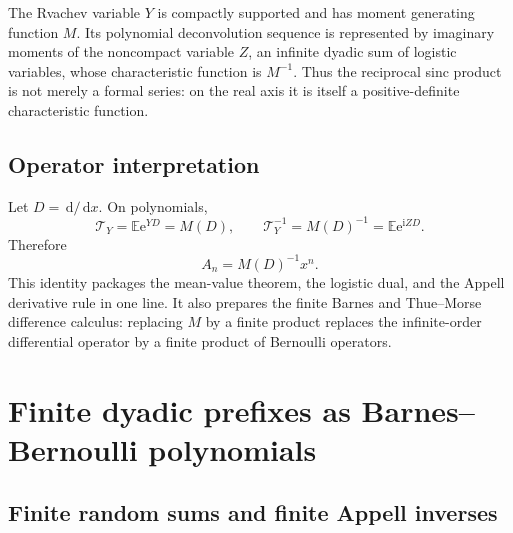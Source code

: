 \documentclass[11pt,oneside]{article}
\theoremstyle{frontier}
\theoremstyle{definition}
\theoremstyle{remark}
\newcommand{\e}{\mathrm e}
\newcommand{\ii}{\mathrm i}
\newcommand{\dd}{\,\mathrm d}
\begin{document}
\begin{resultbox}
The Rvachev variable $Y$ is compactly supported and has moment generating function $M$.  Its
polynomial deconvolution sequence is represented by imaginary moments of the noncompact variable
$Z$, an infinite dyadic sum of logistic variables, whose characteristic function is $M^{-1}$.
Thus the reciprocal sinc product is not merely a formal series: on the real axis it is itself a
positive-definite characteristic function.
\end{resultbox}

\subsection{Operator interpretation}

Let $D=\dd/\dd x$.  On polynomials,
\begin{equation}
 \mathcal T_Y=\mathbb E\e^{YD}=M(D),
 \qquad
 \mathcal T_Y^{-1}=M(D)^{-1}=\mathbb E\e^{\ii ZD}.
 \label{eq:operator-deconvolution}
\end{equation}
Therefore
\begin{equation}
 A_n=M(D)^{-1}x^n.
 \label{eq:A-operator}
\end{equation}
This identity packages the mean-value theorem, the logistic dual, and the Appell derivative rule in
one line.  It also prepares the finite Barnes and Thue--Morse difference calculus: replacing $M$ by
a finite product replaces the infinite-order differential operator by a finite product of Bernoulli
operators.

\section{Finite dyadic prefixes as Barnes--Bernoulli polynomials}
\label{sec:barnes}

\subsection{Finite random sums and finite Appell inverses}
\end{document}
